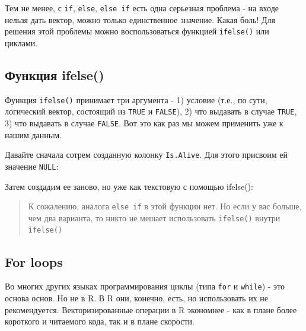 \documentclass[]{book}
\newenvironment{Shaded}{\begin{snugshade}}{\end{snugshade}}
\newcommand{\KeywordTok}[1]{\textcolor[rgb]{0.13,0.29,0.53}{\textbf{#1}}}
\newcommand{\StringTok}[1]{\textcolor[rgb]{0.31,0.60,0.02}{#1}}
\newcommand{\OtherTok}[1]{\textcolor[rgb]{0.56,0.35,0.01}{#1}}
\newcommand{\OperatorTok}[1]{\textcolor[rgb]{0.81,0.36,0.00}{\textbf{#1}}}
\newcommand{\NormalTok}[1]{#1}
\begin{document}
Тем не менее, с \texttt{if}, \texttt{else}, \texttt{else\ if} есть одна
серьезная проблема - на входе нельзя дать вектор, можно только
единственное значение. Какая боль! Для решения этой проблемы можно
воспользоваться функцией \texttt{ifelse()} или циклами.

\subsection{Функция ifelse()}\label{ifelse}

Функция \texttt{ifelse()} принимает три аргумента - 1) условие (т.е., по
сути, логический вектор, состоящий из \texttt{TRUE} и \texttt{FALSE}),
2) что выдавать в случае \texttt{TRUE}, 3) что выдавать в случае
\texttt{FALSE}. Вот это как раз мы можем применить уже к нашим данным.

Давайте сначала сотрем созданную колонку \texttt{Is.Alive}. Для этого
присвоим ей значение \texttt{NULL}:

\begin{Shaded}
\end{Shaded}

Затем создадим ее заново, но уже как текстовую с помощью ifelse():

\begin{Shaded}
\end{Shaded}

\begin{quote}
К сожалению, аналога \texttt{else\ if} в этой функции нет. Но если у вас
больше, чем два варианта, то никто не мешает использовать
\texttt{ifelse()} внутри \texttt{ifelse()}
\end{quote}

\subsection{For loops}\label{for}

Во многих других языках программирования циклы (типа \texttt{for} и
\texttt{while}) - это основа основ. Но не в R. В R они, конечно, есть,
но использовать их не рекомендуется. Векторизированные операции в R
экономнее - как в плане более короткого и читаемого кода, так и в плане
скорости.
\end{document}
